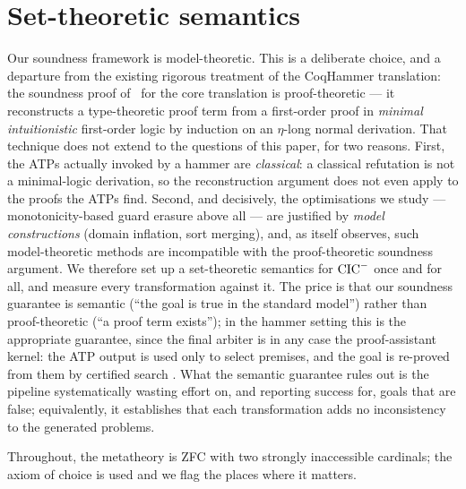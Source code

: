 \section{Set-theoretic semantics}
\label{sec:semantics}

Our soundness framework is model-theoretic.  This is a deliberate
choice, and a departure from the existing rigorous treatment of the
CoqHammer translation: the soundness proof of~\cite{Czajka2016} for
the core translation is proof-theoretic --- it reconstructs a
type-theoretic proof term from a first-order proof in \emph{minimal
intuitionistic} first-order logic by induction on an $\eta$-long
normal derivation.  That technique does not extend to the questions
of this paper, for two reasons.  First, the ATPs actually invoked by
a hammer are \emph{classical}: a classical refutation is not a
minimal-logic derivation, so the reconstruction argument does not
even apply to the proofs the ATPs find.  Second, and decisively, the
optimisations we study --- monotonicity-based guard erasure above all
--- are justified by \emph{model constructions} (domain inflation,
sort merging), and, as \cite[\S6]{Czajka2016} itself observes, such
model-theoretic methods are incompatible with the proof-theoretic
soundness argument.  We therefore set up a set-theoretic semantics
for $\mathrm{CIC}^{-}$ once and for all, and measure every transformation
against it.  The price is that our soundness guarantee is semantic
(``the goal is true in the standard model'') rather than
proof-theoretic (``a proof term exists''); in the hammer setting this
is the appropriate guarantee, since the final arbiter is in any case
the proof-assistant kernel: the ATP output is used only to select
premises, and the goal is re-proved from them by certified search
\cite{CzajkaKaliszyk2018}.  What the semantic guarantee rules out is
the pipeline systematically wasting effort on, and reporting success
for, goals that are false; equivalently, it establishes that each
transformation adds no inconsistency to the generated problems.

Throughout, the metatheory is ZFC with two strongly inaccessible
cardinals; the axiom of choice is used and we flag the places where
it matters.

